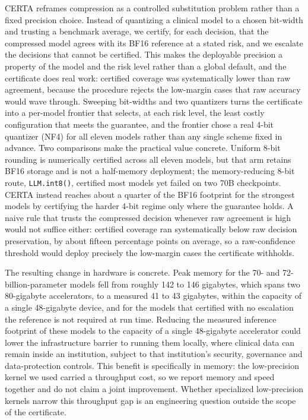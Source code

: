 \documentclass[pdflatex,sn-mathphys-num]{sn-jnl}%
\theoremstyle{thmstyleone}%
\theoremstyle{thmstyletwo}%
\theoremstyle{thmstylethree}%
\begin{document}
CERTA reframes compression as a controlled substitution problem rather than a fixed precision
choice. Instead of quantizing a clinical model to a chosen bit-width and trusting a benchmark
average, we certify, for each decision, that the compressed model agrees with its BF16
reference at a stated risk, and we escalate the decisions that cannot be certified. This makes the
deployable precision a property of the model and the risk level rather than a global default, and
the certificate does real work: certified coverage was systematically lower than raw agreement,
because the procedure rejects the low-margin cases that raw accuracy would wave through. Sweeping
bit-widths and two quantizers turns the certificate into a per-model frontier that selects, at each
risk level, the least costly configuration that meets the guarantee, and the frontier chose a real
4-bit quantizer (NF4) for all eleven models rather than any single scheme fixed in advance. Two
comparisons make the practical value concrete. Uniform 8-bit rounding is numerically certified across
all eleven models, but that arm retains BF16 storage and is not a half-memory deployment; the
memory-reducing 8-bit route, \texttt{LLM.int8()}, certified most models yet failed on two 70B checkpoints. CERTA
instead reaches about a quarter of the BF16 footprint for the strongest models by certifying the harder
4-bit regime only where the guarantee holds. A naive rule that
trusts the compressed decision whenever raw agreement is high would not suffice either: certified
coverage ran systematically below raw decision preservation, by about fifteen percentage points on
average, so a raw-confidence threshold would deploy precisely the low-margin cases the certificate
withholds.
 
The resulting change in hardware is concrete. Peak memory for the 70- and 72-billion-parameter
models fell from roughly 142 to 146 gigabytes, which spans two 80-gigabyte accelerators, to a measured 41
to 43 gigabytes, within the capacity of a single 48-gigabyte device, and for the models that certified with no
escalation the reference is not required at run time. Reducing the measured inference footprint of these
models to the capacity of a single 48-gigabyte accelerator could lower the infrastructure barrier to running
them locally, where clinical data can remain inside an institution, subject to that institution's
security, governance and data-protection controls. This benefit is specifically in
memory: the low-precision kernel we used carried a throughput cost, so we report memory and speed
together and do not claim a joint improvement. Whether specialized low-precision kernels narrow this
throughput gap is an engineering question outside the scope of the certificate.
 
\end{document}
